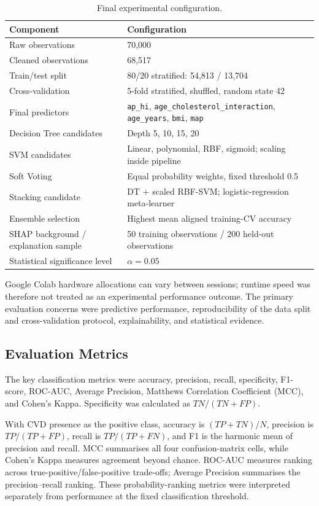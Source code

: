\documentclass[11pt,a4paper]{article}
\newcommand{\code}[1]{\texttt{#1}}
\begin{document}
\begin{table}[htbp]
\centering
\small
\begin{tabularx}{\textwidth}{@{}lX@{}}
\toprule
\textbf{Component} & \textbf{Configuration}\\
\midrule
Raw observations & 70,000\\
Cleaned observations & 68,517\\
Train/test split & 80/20 stratified: 54,813 / 13,704\\
Cross-validation & 5-fold stratified, shuffled, random state 42\\
Final predictors & \code{ap\_hi}, \code{age\_cholesterol\_interaction}, \code{age\_years}, \code{bmi}, \code{map}\\
Decision Tree candidates & Depth 5, 10, 15, 20\\
SVM candidates & Linear, polynomial, RBF, sigmoid; scaling inside pipeline\\
Soft Voting & Equal probability weights, fixed threshold 0.5\\
Stacking candidate & DT + scaled RBF-SVM; logistic-regression meta-learner\\
Ensemble selection & Highest mean aligned training-CV accuracy\\
SHAP background / explanation sample & 50 training observations / 200 held-out observations\\
Statistical significance level & $\alpha=0.05$\\
\bottomrule
\end{tabularx}
\caption{Final experimental configuration.}
\label{tab:setup}
\end{table}

Google Colab hardware allocations can vary between sessions; runtime speed was therefore not treated as an experimental performance outcome. The primary evaluation concerns were predictive performance, reproducibility of the data split and cross-validation protocol, explainability, and statistical evidence.

\subsection{Evaluation Metrics}

The key classification metrics were accuracy, precision, recall, specificity, F1-score, ROC-AUC, Average Precision, Matthews Correlation Coefficient (MCC), and Cohen's Kappa. Specificity was calculated as $TN/(TN+FP)$.

With CVD presence as the positive class, accuracy is $(TP+TN)/N$, precision is $TP/(TP+FP)$, recall is $TP/(TP+FN)$, and F1 is the harmonic mean of precision and recall. MCC summarises all four confusion-matrix cells, while Cohen's Kappa measures agreement beyond chance. ROC-AUC measures ranking across true-positive/false-positive trade-offs; Average Precision summarises the precision--recall ranking. These probability-ranking metrics were interpreted separately from performance at the fixed classification threshold.
\end{document}
